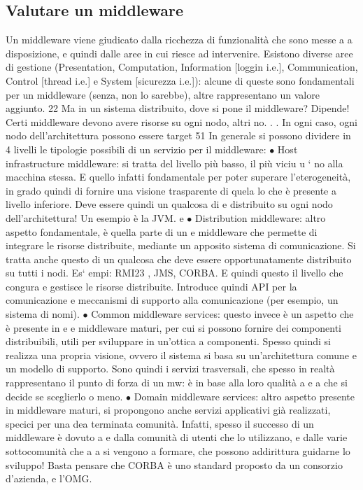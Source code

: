 \documentclass[a4paper,12pt]{article}
\begin{document}
\subsection{Valutare un middleware}
Un middleware viene giudicato dalla ricchezza di funzionalità che sono messe a
a
disposizione, e quindi dalle aree in cui riesce ad intervenire. Esistono diverse
aree di gestione (Presentation, Computation, Information [loggin i.e.], Communication, Control [thread i.e.] e System
[sicurezza i.e.]): alcune di queste sono
fondamentali per un middleware (senza, non lo sarebbe), altre rappresentano
un valore aggiunto.
22 Ma in un sistema distribuito, dove si pone il middleware? Dipende! Certi middleware
devono avere risorse su ogni nodo, altri no. . . In ogni caso, ogni nodo dell'architettura possono
essere target
51
In generale si possono dividere in 4 livelli le tipologie possibili di un servizio
per il middleware:
$\bullet$ Host infrastructure middleware: si tratta del livello più basso, il più viciu
u
`
no alla macchina stessa. E quello infatti fondamentale per poter superare
l'eterogeneità, in grado quindi di fornire una visione trasparente di quela
lo che è presente a livello inferiore. Deve essere quindi un qualcosa di
e
distribuito su ogni nodo dell'architettura! Un esempio è la JVM.
e
$\bullet$ Distribution middleware: altro aspetto fondamentale, è quella parte di un
e
middleware che permette di integrare le risorse distribuite, mediante un
apposito sistema di comunicazione. Si tratta anche questo di un qualcosa che deve essere opportunatamente distribuito su
tutti i nodi. Es`
empi: RMI23 , JMS, CORBA. E quindi questo il livello che congura e
gestisce le risorse distribuite. Introduce quindi API per la comunicazione
e meccanismi di supporto alla comunicazione (per esempio, un sistema di
nomi).
$\bullet$ Common middleware services: questo invece è un aspetto che è presente in
e
e
middleware maturi, per cui si possono fornire dei componenti distribuibili,
utili per sviluppare in un'ottica a componenti. Spesso quindi si realizza
una propria visione, ovvero il sistema si basa su un'architettura comune
e un modello di supporto. Sono quindi i servizi trasversali, che spesso in
realtà rappresentano il punto di forza di un mw: è in base alla loro qualità
a
e
a
che si decide se sceglierlo o meno.
$\bullet$ Domain middleware services: altro aspetto presente in middleware maturi,
si propongono anche servizi applicativi già realizzati, specici per una dea
terminata comunità. Infatti, spesso il successo di un middleware è dovuto
a
e
dalla comunità di utenti che lo utilizzano, e dalle varie sottocomunità che
a
a
si vengono a formare, che possono addirittura guidarne lo sviluppo! Basta
pensare che CORBA è uno standard proposto da un consorzio d'azienda,
e
l'OMG.
\end{document}
